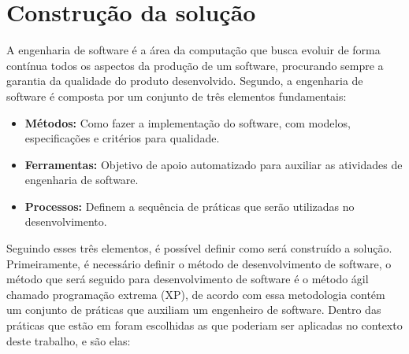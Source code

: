 \section{Construção da solução}
\label{section:construcao}

A engenharia de software é a área da computação que busca evoluir de forma contínua
todos os aspectos da produção de um software, procurando sempre a garantia da
qualidade do produto desenvolvido. Segundo\cite{pressman2011engenharia}, a engenharia
de software é composta por um conjunto de três elementos fundamentais:

\begin{itemize}
  \item \textbf{Métodos:} Como fazer a implementação do software, com modelos,
  especificações e critérios para qualidade.
  \item \textbf{Ferramentas:} Objetivo de apoio automatizado para auxiliar as atividades
  de engenharia de software.
  \item \textbf{Processos:} Definem a sequência de práticas que serão utilizadas no
  desenvolvimento.
\end{itemize}

Seguindo esses três elementos, é possível definir como será construído a solução.
Primeiramente, é necessário definir o método de desenvolvimento de software, o
método que será seguido  para desenvolvimento de software é o método ágil chamado
programação extrema (XP), de acordo com\cite{796139} essa metodologia contém um
conjunto de práticas que auxiliam um engenheiro de software. Dentro das práticas
que estão em\cite{796139} foram escolhidas as que poderiam ser aplicadas no
contexto deste trabalho, e são elas:

